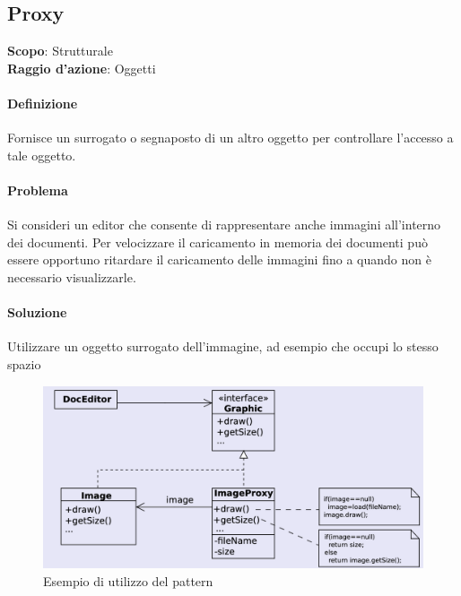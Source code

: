 \subsection{Proxy}

\textbf{Scopo}: Strutturale \\
\textbf{Raggio d'azione}: Oggetti

\paragraph{Definizione} Fornisce un surrogato o segnaposto di un altro oggetto per controllare l'accesso a tale oggetto.

\paragraph{Problema} Si consideri un editor che consente di rappresentare anche immagini all’interno dei documenti. Per velocizzare il caricamento in memoria dei documenti può essere opportuno ritardare il caricamento delle immagini fino a quando non è necessario visualizzarle.

\paragraph{Soluzione} Utilizzare un oggetto surrogato dell’immagine, ad esempio che occupi lo stesso spazio

\begin{figure}[H]
    \centering
    \includegraphics[width=1\linewidth]{assets/pattern/proxy/proxy-esempio.png}
    \caption{Esempio di utilizzo del pattern}
\end{figure}

